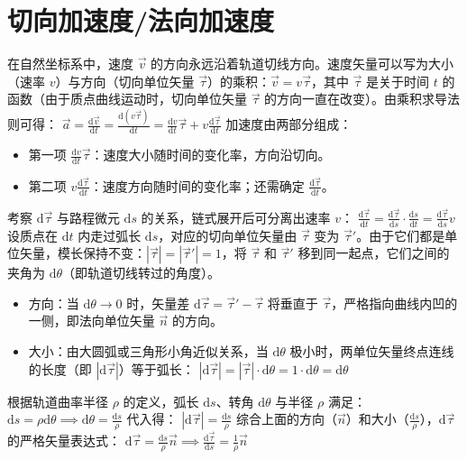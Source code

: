 \section{切向加速度/法向加速度}

在自然坐标系中，速度 $\vec{v}$ 的方向永远沿着轨道切线方向。速度矢量可以写为大小（速率 $v$）与方向（切向单位矢量 $\vec{\tau}$）的乘积：$\vec{v} = v\vec{\tau}$，其中 $\vec{\tau}$ 是关于时间 $t$ 的函数（由于质点曲线运动时，切向单位矢量 $\vec{\tau}$ 的方向一直在改变）。由乘积求导法则可得： \(\vec{a} = \frac{\mathrm{d}\vec{v}}{\mathrm{d}t} = \frac{\mathrm{d}(v\vec{\tau})}{\mathrm{d}t} = \frac{\mathrm{d}v}{\mathrm{d}t}\vec{\tau} + v\frac{\mathrm{d}\vec{\tau}}{\mathrm{d}t}\) 
加速度由两部分组成：
\begin{itemize}
\item 第一项 $\frac{\mathrm{d}v}{\mathrm{d}t}\vec{\tau}$：速度大小随时间的变化率，方向沿切向。
\item 第二项 $v\frac{\mathrm{d}\vec{\tau}}{\mathrm{d}t}$：速度方向随时间的变化率；还需确定 $\frac{\mathrm{d}\vec{\tau}}{\mathrm{d}t}$。
\end{itemize}
考察 $\mathrm{d}\vec{\tau}$ 与路程微元 $\mathrm{d}s$ 的关系，链式展开后可分离出速率 $v$：
 \(\frac{\mathrm{d}\vec{\tau}}{\mathrm{d}t} = \frac{\mathrm{d}\vec{\tau}}{\mathrm{d}s} \cdot \frac{\mathrm{d}s}{\mathrm{d}t} = \frac{\mathrm{d}\vec{\tau}}{\mathrm{d}s} v\) 
设质点在 $\mathrm{d}t$ 内走过弧长 $\mathrm{d}s$，对应的切向单位矢量由 $\vec{\tau}$ 变为 $\vec{\tau}'$。由于它们都是单位矢量，模长保持不变：$|\vec{\tau}| = |\vec{\tau}'| = 1$，将 $\vec{\tau}$ 和 $\vec{\tau}'$ 移到同一起点，它们之间的夹角为 $\mathrm{d}\theta$（即轨道切线转过的角度）。
\begin{itemize}
\item 方向：当 $\mathrm{d}\theta \to 0$ 时，矢量差 $\mathrm{d}\vec{\tau} = \vec{\tau}' - \vec{\tau}$ 将垂直于 $\vec{\tau}$，严格指向曲线内凹的一侧，即法向单位矢量 $\vec{n}$ 的方向。
\item 大小：由大圆弧或三角形小角近似关系，当 $\mathrm{d}\theta$ 极小时，两单位矢量终点连线的长度（即 $|\mathrm{d}\vec{\tau}|$）等于弧长： \(|\mathrm{d}\vec{\tau}| = |\vec{\tau}| \cdot \mathrm{d}\theta = 1 \cdot \mathrm{d}\theta = \mathrm{d}\theta\) 
\end{itemize}
根据轨道曲率半径 $\rho$ 的定义，弧长 $\mathrm{d}s$、转角 $\mathrm{d}\theta$ 与半径 $\rho$ 满足：
 \(\mathrm{d}s = \rho \mathrm{d}\theta \implies \mathrm{d}\theta = \frac{\mathrm{d}s}{\rho}\) 
代入得： \(|\mathrm{d}\vec{\tau}| = \frac{\mathrm{d}s}{\rho}\) 
综合上面的方向（$\vec{n}$）和大小（$\frac{\mathrm{d}s}{\rho}$），$\mathrm{d}\vec{\tau}$ 的严格矢量表达式： \(\mathrm{d}\vec{\tau} = \frac{\mathrm{d}s}{\rho}\vec{n} \implies \frac{\mathrm{d}\vec{\tau}}{\mathrm{d}s} = \frac{1}{\rho}\vec{n}\) 
